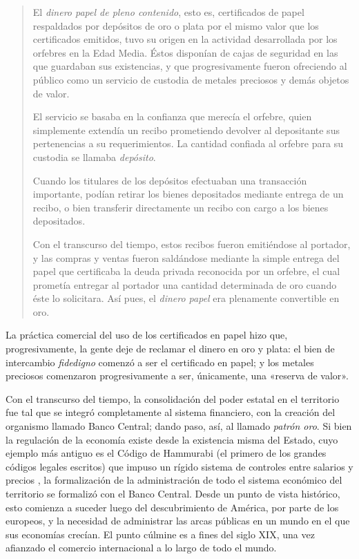 \documentclass[12pt,a4paper,twoside]{book}
\begin{document}
\begin{quotation}
El \textit{dinero papel de pleno contenido}, esto es, certificados de papel respaldados por depósitos de oro o plata por el mismo valor que los certificados emitidos, tuvo su origen en la actividad desarrollada por los orfebres en la Edad Media. Éstos disponían de cajas de seguridad en las que guardaban sus existencias, y que progresivamente fueron ofreciendo al público como un servicio de custodia de metales preciosos y demás objetos de valor.

El servicio se basaba en la confianza que merecía el orfebre, quien simplemente extendía un recibo prometiendo devolver al depositante sus pertenencias a su requerimientos. La cantidad confiada al orfebre para su custodia se llamaba \textit{depósito}.

Cuando los titulares de los depósitos efectuaban una transacción importante, podían retirar los bienes depositados mediante entrega de un recibo, o bien transferir directamente un recibo con cargo a los bienes depositados.

Con el transcurso del tiempo, estos recibos fueron emitiéndose al portador, y las compras y ventas fueron saldándose mediante la simple entrega del papel que certificaba la deuda privada reconocida por un orfebre, el cual prometía entregar al portador una cantidad determinada de oro cuando éste lo solicitara. Así pues, el \textit{dinero papel} era plenamente convertible en oro. \cite[pág. 265]{mochobeker}
\end{quotation}

La práctica comercial del uso de los certificados en papel hizo que, progresivamente, la gente deje de reclamar el dinero en oro y plata: el bien de intercambio \textit{fidedigno} comenzó a ser el certificado en papel; y los metales preciosos comenzaron progresivamente a ser, únicamente, una «reserva de valor».

Con el transcurso del tiempo, la consolidación del poder estatal en el territorio fue tal que se integró completamente al sistema financiero, con la creación del organismo llamado Banco Central; dando paso, así, al llamado \textit{patrón oro}. Si bien la regulación de la economía existe desde la existencia misma del Estado, cuyo ejemplo más antiguo es el Código de Hammurabi (el primero de los grandes códigos legales escritos) que impuso un rígido sistema de controles entre salarios y precios \cite[pág. 26]{4milanos}, la formalización de la administración de todo el sistema económico del territorio se formalizó con el Banco Central. Desde un punto de vista histórico, esto comienza a suceder luego del descubrimiento de América, por parte de los europeos, y la necesidad de administrar las arcas públicas en un mundo en el que sus economías crecían. El punto cúlmine es a fines del siglo XIX, una vez afianzado el comercio internacional a lo largo de todo el mundo.
\end{document}
